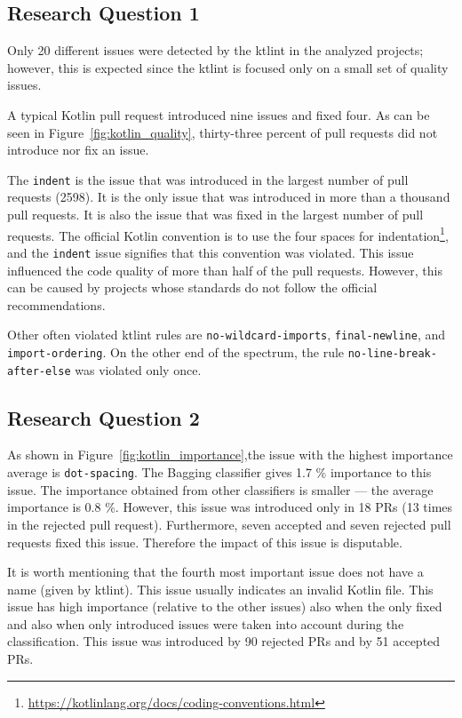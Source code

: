 \documentclass[digital,oneside,oldtable,nolof,nolot,nocover]{fithesis4}
\begin{document}
\subsection{Research Question 1}
\label{sec:org24af383}
Only 20 different issues were detected by the ktlint in the analyzed projects;
however, this is expected since the ktlint is focused only on a small set of quality issues.

A typical Kotlin pull request introduced nine issues and fixed four.
As can be seen in Figure~\ref{fig:kotlin_quality}, thirty-three percent
of pull requests did not introduce nor fix an issue.

The \texttt{indent} is the issue that was introduced in the largest number of pull requests (2598). It is the
only issue that was introduced in more than a thousand pull requests. It is also the issue
that was fixed in the largest number of pull requests. The official Kotlin convention is
to use the four spaces for indentation\footnote{\url{https://kotlinlang.org/docs/coding-conventions.html}},
and the \texttt{indent} issue signifies that this convention was violated. This issue influenced
the code quality of more than half of the pull requests. However, this can be caused by projects
whose standards do not follow the official recommendations.

Other often violated ktlint rules are \texttt{no-wildcard-imports}, \texttt{final-newline}, and \texttt{import-ordering}.
On the other end of the spectrum, the rule \texttt{no-line-break-after-else} was violated only once.
\subsection{Research Question 2}
\label{sec:org0a40699}
As shown in Figure~\ref{fig:kotlin_importance},the issue with
the highest importance average is \texttt{dot-spacing}.
The Bagging classifier gives 1.7 \% importance to this issue. The importance obtained from other
classifiers is smaller --- the average importance is 0.8 \%.
However, this issue was introduced only in 18 PRs (13 times in the rejected pull request).
Furthermore, seven accepted and seven rejected pull requests fixed this issue.
Therefore the impact of this issue is disputable.

It is worth mentioning that the fourth most important issue does not have a name
(given by ktlint).  This issue usually indicates an invalid Kotlin file.  This
issue has high importance (relative to the other issues) also when the only
fixed and also when only introduced issues were taken into account during the
classification. This issue was introduced by 90 rejected PRs and by 51
accepted PRs.
\end{document}
